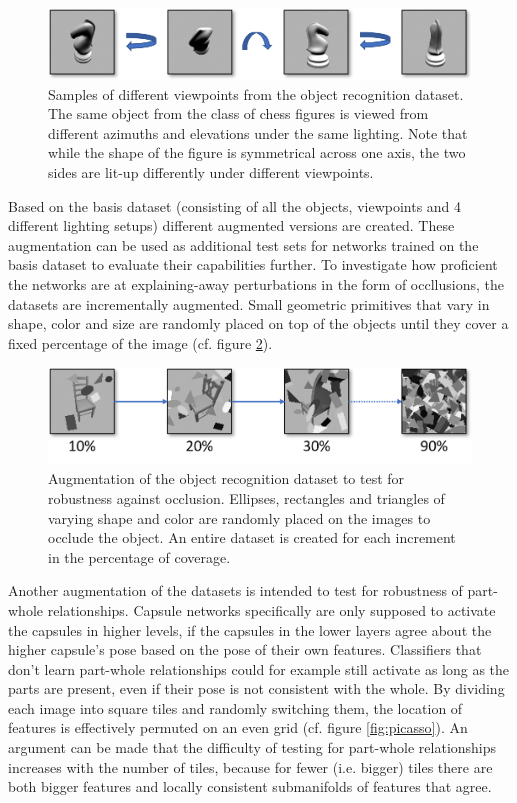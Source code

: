 \begin{figure}[H]
    \centering
    \includegraphics[width=\textwidth]{figures/viewpoint.png}
\caption[Samples of different viewpoints from the object recognition dataset.]{Samples of different viewpoints from the object recognition dataset. The same object from the class of chess figures is viewed from different azimuths and elevations under the same lighting. Note that while the shape of the figure is symmetrical across one axis, the two sides are lit-up differently under different viewpoints.}\label{fig:viewpoint}
\end{figure}\noindent
Based on the basis dataset (consisting of all the objects, viewpoints and 4 different lighting setups) different augmented versions are created. These augmentation can be used as additional test sets for networks trained on the basis dataset to evaluate their capabilities further. To investigate how proficient the networks are at explaining-away perturbations in the form of occllusions, the datasets are incrementally augmented. Small geometric primitives that vary in shape, color and size are randomly placed on top of the objects until they cover a fixed percentage of the image (cf. figure \ref{fig:occlusion}).
\begin{figure}[H]
    \centering
    \includegraphics[width=\textwidth]{figures/occlusion.png}
\caption[Augmentation of the object recognition dataset to test for robustness against occlusion]{Augmentation of the object recognition dataset to test for robustness against occlusion. Ellipses, rectangles and triangles of varying shape and color are randomly placed on the images to occlude the object. An entire dataset is created for each increment in the percentage of coverage.}\label{fig:occlusion}
\end{figure}\newpage\noindent
Another augmentation of the datasets is intended to test for robustness of part-whole relationships. Capsule networks specifically are only supposed to activate the capsules in higher levels, if the capsules in the lower layers agree about the higher capsule's pose based on the pose of their own features. Classifiers that don't learn part-whole relationships could for example still activate as long as the parts are present, even if their pose is not consistent with the whole. By dividing each image into square tiles and randomly switching them, the location of features is effectively permuted on an even grid (cf. figure \ref{fig:picasso}). An argument can be made that the difficulty of testing for part-whole relationships increases with the number of tiles, because for fewer (i.e. bigger) tiles there are both bigger features and locally consistent submanifolds of features that agree.
